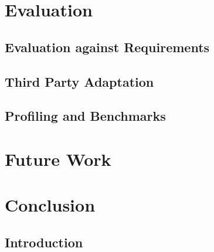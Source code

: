\documentclass[12pt, a4paper]{article}
\begin{document}


\section{Evaluation}


\subsection{Evaluation against Requirements}


\subsection{Third Party Adaptation}


\subsection{Profiling and Benchmarks}


\section{Future Work}


\section{Conclusion}


\subsection{Introduction}
\end{document}
